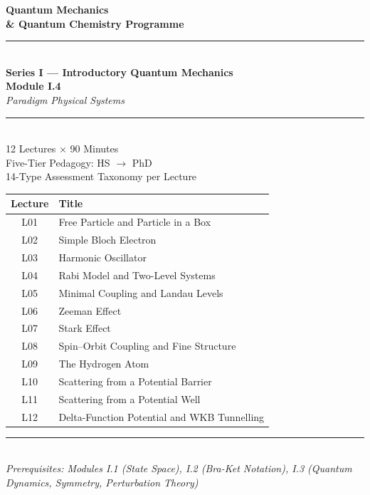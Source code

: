 



\begin{titlepage}
\pagecolor{darkblue}
\color{white}
\vspace*{2cm}
\begin{center}
  {\fontsize{28}{34}\selectfont\bfseries Quantum Mechanics}\\[0.4cm]
  {\fontsize{18}{24}\selectfont\bfseries \& Quantum Chemistry Programme}\\[0.6cm]
  {\color{accentgold}\rule{10cm}{2pt}}\\[0.6cm]
  {\large\bfseries Series I --- Introductory Quantum Mechanics}\\[0.3cm]
  {\LARGE\bfseries Module I.4}\\[0.3cm]
  {\large\itshape Paradigm Physical Systems}\\[0.4cm]
  {\color{accentgold}\rule{10cm}{1pt}}\\[0.8cm]
  {\normalsize 12 Lectures $\times$ 90 Minutes}\\[0.2cm]
  {\normalsize Five-Tier Pedagogy: HS $\to$ PhD}\\[0.2cm]
  {\normalsize 14-Type Assessment Taxonomy per Lecture}\\[1.6cm]
  \begin{tabular}{@{}cl@{}}
    \toprule
    \textbf{Lecture} & \textbf{Title} \\
    \midrule
    L01 & Free Particle and Particle in a Box \\
    L02 & Simple Bloch Electron \\
    L03 & Harmonic Oscillator \\
    L04 & Rabi Model and Two-Level Systems \\
    L05 & Minimal Coupling and Landau Levels \\
    L06 & Zeeman Effect \\
    L07 & Stark Effect \\
    L08 & Spin--Orbit Coupling and Fine Structure \\
    L09 & The Hydrogen Atom \\
    L10 & Scattering from a Potential Barrier \\
    L11 & Scattering from a Potential Well \\
    L12 & Delta-Function Potential and WKB Tunnelling \\
    \bottomrule
  \end{tabular}
\end{center}
\vfill
{\color{accentgold}\rule{10cm}{0.8pt}}\\[0.3cm]
{\small\itshape Prerequisites: Modules I.1 (State Space), I.2 (Bra-Ket Notation),
I.3 (Quantum Dynamics, Symmetry, Perturbation Theory)}
\end{titlepage}
\nopagecolor
\color{black}

